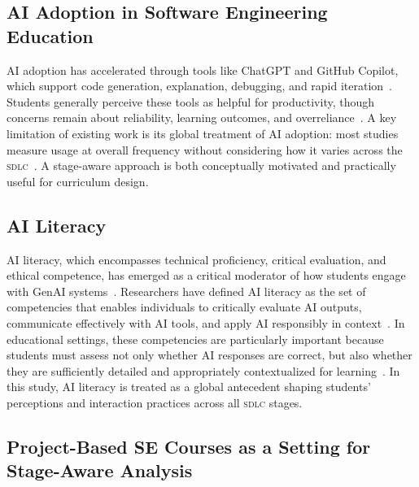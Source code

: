 \documentclass[sigconf,anonymous]{acmart}
\newcommand{\SDLC}{\textsc{sdlc}\xspace}
\newcommand{\GenAI}{GenAI\xspace}
\begin{document}
\subsection{AI Adoption in Software Engineering Education}
AI adoption has accelerated through tools like ChatGPT and GitHub
Copilot, which support code generation, explanation, debugging, and rapid
iteration~\cite{becker2023, kazemitabaar2023, ali2025}. Students
generally perceive these tools as helpful for productivity, though
concerns remain about reliability, learning outcomes, and
overreliance~\cite{pirzado2024, sakib2023}. A key limitation of existing
work is its global treatment of AI adoption: most studies measure usage
at overall frequency without considering how it varies across the
\SDLC~\cite{russo2024}. A stage-aware approach is both conceptually
motivated and practically useful for curriculum design.

\subsection{AI Literacy}
AI literacy, which encompasses technical proficiency, critical 
evaluation, and ethical competence, has emerged as a critical 
moderator of how students engage with \GenAI systems~\cite{lee2024}. 
Researchers have defined AI literacy as the set of competencies 
that enables individuals to critically evaluate AI outputs, 
communicate effectively with AI tools, and apply AI responsibly 
in context~\cite{long2020, ng2021}. In educational settings, 
these competencies are particularly important because students 
must assess not only whether AI responses are correct, but also 
whether they are sufficiently detailed and appropriately 
contextualized for learning~\cite{nath2024}. In this study, AI 
literacy is treated as a global antecedent shaping students' 
perceptions and interaction practices across all \SDLC stages.

\subsection{Project-Based SE Courses as a Setting for Stage-Aware Analysis}
\end{document}
